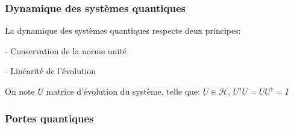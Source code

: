 \documentclass{beamer}
\begin{document}
\begin{frame}
  \frametitle{Dynamique des systèmes quantiques}

  \begin{definition}
    La dynamique des systèmes quantiques respecte deux principes:
    \begin{list}{}
      \item - Conservation de la norme unité
      \item - Linéarité de l'évolution
    \end{list}

    On note $U$ matrice d'évolution du système, telle que:  $U \in \mathcal{H}$, $U^{\dagger}U = UU^{\dagger} = I$
  \end{definition}

\end{frame}


\begin{frame}
  \frametitle{Portes quantiques}


\end{frame}
\end{document}
